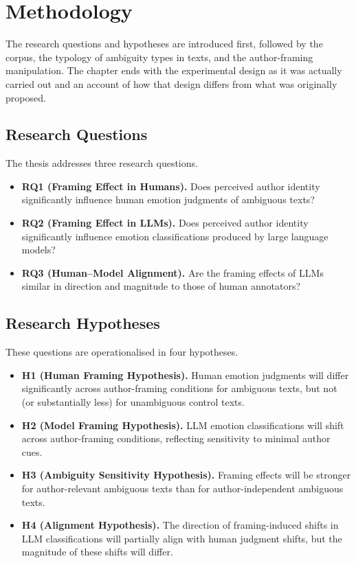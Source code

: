 \chapter{Methodology}
\label{c:methodology}

\noindent
The research questions and hypotheses are introduced first, followed by the corpus, the typology
of ambiguity types in texts, and the author-framing manipulation. The chapter ends with the
experimental design as it was actually carried out and an account of how that design differs
from what was originally proposed.

\section{Research Questions}
\label{meth:rqs}

\noindent
The thesis addresses three research questions.

\begin{itemize}
    \item \textbf{RQ1 (Framing Effect in Humans).} Does perceived author identity significantly
    influence human emotion judgments of ambiguous texts?

    \item \textbf{RQ2 (Framing Effect in LLMs).} Does perceived author identity significantly
    influence emotion classifications produced by large language models?

    \item \textbf{RQ3 (Human--Model Alignment).} Are the framing effects of LLMs similar in
    direction and magnitude to those of human annotators?
\end{itemize}

\section{Research Hypotheses}
\label{meth:hypotheses}

\noindent
These questions are operationalised in four hypotheses.

\begin{itemize}
    \item \textbf{H1 (Human Framing Hypothesis).} Human emotion judgments will differ significantly
    across author-framing conditions for ambiguous texts, but not (or substantially less) for
    unambiguous control texts.

    \item \textbf{H2 (Model Framing Hypothesis).} LLM emotion classifications will shift across
    author-framing conditions, reflecting sensitivity to minimal author cues.

    \item \textbf{H3 (Ambiguity Sensitivity Hypothesis).} Framing effects will be stronger for
    author-relevant ambiguous texts than for author-independent ambiguous texts.

    \item \textbf{H4 (Alignment Hypothesis).} The direction of framing-induced shifts in LLM
    classifications will partially align with human judgment shifts, but the magnitude of these
    shifts will differ.
\end{itemize}

